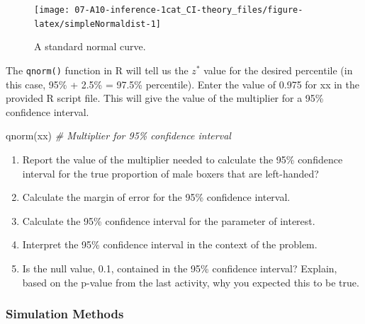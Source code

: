 \documentclass[
]{report}
\newenvironment{Shaded}{\begin{snugshade}}{\end{snugshade}}
\newcommand{\CommentTok}[1]{\textcolor[rgb]{0.56,0.35,0.01}{\textit{#1}}}
\newcommand{\FunctionTok}[1]{\textcolor[rgb]{0.00,0.00,0.00}{#1}}
\newcommand{\NormalTok}[1]{#1}
\begin{document}
\begin{figure}

{\centering \texttt{[image: 07-A10-inference-1cat\_CI-theory\_files/figure-latex/simpleNormaldist-1]} 

}

\caption{A standard normal curve.}\label{fig:simpleNormaldist}
\end{figure}

The \texttt{qnorm()} function in R will tell us the \(z^*\) value for the desired percentile (in this case, 95\% + 2.5\% = 97.5\% percentile). Enter the value of 0.975 for xx in the provided R script file. This will give the value of the multiplier for a 95\% confidence interval.

\begin{Shaded}
\begin{Highlighting}[]
\FunctionTok{qnorm}\NormalTok{(xx) }\CommentTok{\# Multiplier for 95\% confidence interval}
\end{Highlighting}
\end{Shaded}

\begin{enumerate}
\def\labelenumi{\arabic{enumi}.}
\setcounter{enumi}{2}
\item
  Report the value of the multiplier needed to calculate the 95\% confidence interval for the true proportion of male boxers that are left-handed?
  \vspace{0.3in}
\item
  Calculate the margin of error for the 95\% confidence interval.
  \vspace{1in}
\item
  Calculate the 95\% confidence interval for the parameter of interest.
  \vspace{0.5in}
\item
  Interpret the 95\% confidence interval in the context of the problem.
  \vspace{1in}
\item
  Is the null value, 0.1, contained in the 95\% confidence interval? Explain, based on the p-value from the last activity, why you expected this to be true.
  \vspace{0.5in}
\end{enumerate}

\hypertarget{simulation-methods}{%
\subsubsection*{Simulation Methods}\label{simulation-methods}}
\end{document}
